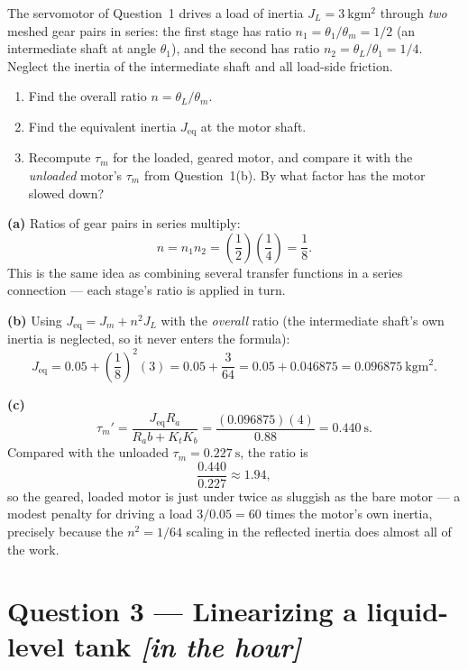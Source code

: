 \documentclass[11pt,a4paper]{article}
\newcommand{\inhour}{\hfill{\small\color{faccent}\itshape[in the hour]}}
\begin{document}
The servomotor of Question~1 drives a load of inertia
$J_L=\SI{3}{\kilogram\metre\squared}$ through \emph{two} meshed gear pairs in
series: the first stage has ratio $n_1=\theta_1/\theta_m=1/2$ (an intermediate
shaft at angle $\theta_1$), and the second has ratio
$n_2=\theta_L/\theta_1=1/4$. Neglect the inertia of the intermediate shaft and
all load-side friction.

\begin{enumerate}[label=(\alph*)]
\item Find the overall ratio $n=\theta_L/\theta_m$.
\item Find the equivalent inertia $J_{\text{eq}}$ at the motor shaft.
\item Recompute $\tau_m$ for the loaded, geared motor, and compare it with the
      \emph{unloaded} motor's $\tau_m$ from Question~1(b). By what factor has
      the motor slowed down?
\end{enumerate}

\begin{solution}
\textbf{(a)} Ratios of gear pairs in series multiply:
\[
  n=n_1n_2=\left(\frac{1}{2}\right)\left(\frac{1}{4}\right)=\frac{1}{8}.
\]
This is the same idea as combining several transfer functions in a series
connection --- each stage's ratio is applied in turn.

\medskip
\textbf{(b)} Using $J_{\text{eq}}=J_m+n^2J_L$ with the \emph{overall} ratio
(the intermediate shaft's own inertia is neglected, so it never enters the
formula):
\[
  J_{\text{eq}}=0.05+\left(\frac{1}{8}\right)^2(3)=0.05+\frac{3}{64}
   =0.05+0.046875=\SI{0.096875}{\kilogram\metre\squared}.
\]

\medskip
\textbf{(c)}
\[
  \tau_m'=\frac{J_{\text{eq}}R_a}{R_ab+K_tK_b}=\frac{(0.096875)(4)}{0.88}
   =\SI{0.440}{\second}.
\]
Compared with the unloaded $\tau_m=\SI{0.227}{\second}$, the ratio is
\[
  \frac{0.440}{0.227}\approx1.94,
\]
so the geared, loaded motor is just under twice as sluggish as the bare motor
--- a modest penalty for driving a load $3/0.05=60$ times the motor's own
inertia, precisely because the $n^2=1/64$ scaling in the reflected inertia
does almost all of the work.
\end{solution}

\section*{Question 3 --- Linearizing a liquid-level tank \inhour}
\end{document}
